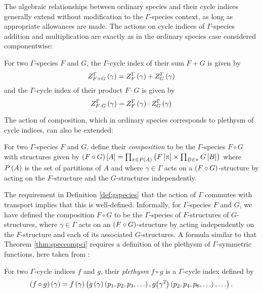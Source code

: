 \documentclass[distribution,draft]{brandiss} %
\numberwithin{section}{chapter}
\numberwithin{figure}{chapter}
\begin{document}
The algebraic relationships between ordinary species and their cycle indices generally extend without modification to the $\Gamma$-species context, as long as appropriate allowances are made.
The actions on cycle indices of $\Gamma$-species addition and multiplication are exactly as in the ordinary species case considered componentwise:
\begin{definition}
  \label{def:gspecsumprod}
  For two $\Gamma$-species $F$ and $G$, the $\Gamma$-cycle index of their sum $F + G$ is given by
  \begin{equation}
    \label{eq:gspecsum}
     Z_{F + G}^{{\Gamma} {}}  \left( {\gamma} \right) =  Z_{F}^{{\Gamma} {}}  \left( {\gamma} \right) +  Z_{G}^{{\Gamma} {}}  \left( {\gamma} \right)
  \end{equation}
  and the $\Gamma$-cycle index of their product $F \cdot G$ is given by
  \begin{equation}
    \label{eq:gspecprod}
     Z_{F \cdot G}^{{\Gamma} {}}  \left( {\gamma} \right) =  Z_{F}^{{\Gamma} {}}  \left( {\gamma} \right) \cdot  Z_{G}^{{\Gamma} {}}  \left( {\gamma} \right)
  \end{equation}
\end{definition}
The action of composition, which in ordinary species corresponds to plethysm of cycle indices, can also be extended:
\begin{definition}
  \label{def:gspeccomp}
  For two $\Gamma$-species $F$ and $G$, define their \emph{composition} to be the $\Gamma$-species $F \circ G$ with structures given by $\left( {F \circ G} \right) \left[ {A} \right] = \prod_{\pi \in P \left( {A} \right)} \left( {F \left[ {\pi} \right] \times \prod_{B \in \pi} G \left[ {B} \right]} \right)$ where $P \left( {A} \right)$ is the set of partitions of $A$ and where $\gamma \in \Gamma$ acts on a $\left( {F \circ G} \right)$-structure by acting on the $F$-structure and the $G$-structures independently.
\end{definition}
The requirement in Definition \ref{def:gspecies} that the action of $\Gamma$ commutes with transport implies that this is well-defined.
Informally, for $\Gamma$-species $F$ and $G$, we have defined the composition $F \circ G$ to be the $\Gamma$-species of $F$-structures of $G$-structures, where $\gamma \in \Gamma$ acts on an $\left( {F \circ G} \right)$-structure by acting independently on the $F$-structure and each of its associated $G$-structures.
A formula similar to that Theorem \ref{thm:speccompci} requires a definition of the plethysm of $\Gamma$-symmetric functions, here taken from \cite[\S 3]{hend:specfield}:
\begin{definition}
  \label{def:gcipleth}
  For two $\Gamma$-cycle indices $f$ and $g$, their \emph{plethysm} $f \circ g$ is a $\Gamma$-cycle index defined by
  \begin{equation}
    \pbrac{f \circ g} \pbrac{\gamma} = f \pbrac{\gamma} \pbrac{g \pbrac{\gamma} \pbrac{p_{1}, p_{2}, p_{3}, \dots}, g \pbracs[big]{\gamma^{2}} \pbrac{p_{2}, p_{4}, p_{6}, \dots}, \dots}.
    \label{eq:gcipleth}
  \end{equation}
\end{definition}
\end{document}
